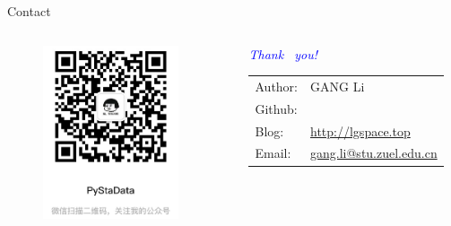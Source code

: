 \documentclass[UTF8]{beamer}
\begin{document}

\begin{frame}{Contact}
\begin{columns}
\begin{column}{.4\linewidth}
\begin{figure}
\includegraphics[width=40mm]{figures/Wechat_QR.jpeg}
\end{figure}
\end{column}
\begin{column}{.6\linewidth}
{\huge \emph{\textcolor{blue}{Thank  ~you!}}}\\
\vspace{5mm}\large
\begin{tabular}{ll}
{\sc Author}:  & GANG Li\\
{\sc Github}: & \href{https://github.com/GangLi-0814}{\color{blue}{GangLi-0814}}\\
{\sc Blog}: & \href{http://lgspace.top}{\color{blue}http://lgspace.top}\\
{\sc Email}: & \href{mailto:gang.li@stu.zuel.edu.cn}{\color{blue}gang.li@stu.zuel.edu.cn}\\
\end{tabular}
\end{column}
\end{columns}
\end{frame}
\end{document}
